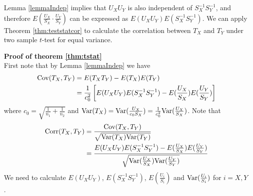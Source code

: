 	
	Lemma \ref{lemmaIndep} implies that  $U_XU_Y$ is also independent of $S_X^{-1}S_Y^{-1}$, and
	therefore $E(\frac{U_X}{S_X} \cdot\frac{U_Y}{S_Y})$ can be expressed as
	$E(U_XU_Y)E(S_X^{-1}S_Y^{-1})$. We can apply Theorem \ref{thm:teststatcor} to calculate the 
	correlation between $T_X$ and $T_Y$ under two sample $t$-test for equal variance. 
	
	\textbf{Proof of theorem \ref{thm:tstat}} \\
	First note that by Lemma  \ref{lemmaIndep} we have
	\begin{align*}
	\text{Cov}(T_X, T_Y) &= E(T_XT_Y) - E(T_X)E(T_Y) \\
	& = \frac{1}{c_0^2} \left[E(U_XU_Y)E(S_X^{-1}S_Y^{-1}) - E(\frac{U_X}{S_X})E( 
	\frac{U_Y}{S_Y})\right]   
	\end{align*}
	where $c_0 = \sqrt{\frac{1}{n_1} + \frac{1}{n_2}}$ and $\text{Var}(T_X) = \text{Var}(\frac{U_X}{c_0S_X})=
	\frac{1}{c_0^2}\text{Var}(\frac{U_X}{S_X})$. 
	Note that 
	\begin{equation}\label{eq:Tcorrelation}
	\begin{aligned}
	\text{Corr}(T_X, T_Y) & = \frac{\text{Cov}(T_X, T_Y) }{\sqrt{\text{Var}(T_X) \text{Var}(T_Y) }} \\
	& = \frac{E(U_XU_Y)E(S_X^{-1}S_Y^{-1}) - E(\frac{U_X}{S_X})E(
		\frac{U_Y}{S_Y})}{\sqrt{\text{Var}(\frac{U_X}{S_X})\text{Var}(\frac{U_Y}{S_Y})}} 
	\end{aligned}
	\end{equation}
	We need to calculate $E(U_XU_Y)$, $E(S_X^{-1}S_Y^{-1})$, $ E(\frac{U_i}{S_i})$ and
	$\text{Var}(\frac{U_i}{S_i})$ for $i =X, Y$. 
